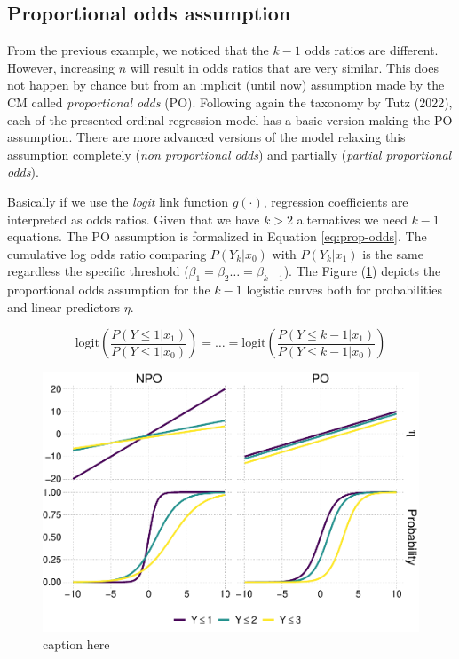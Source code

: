 \documentclass[
  man,floatsintext]{apa6}
\begin{document}
\normalsize

\subsection{Proportional odds assumption}\label{proportional-odds-assumption}

From the previous example, we noticed that the \(k - 1\) odds ratios are different. However, increasing \(n\) will result in odds ratios that are very similar. This does not happen by chance but from an implicit (until now) assumption made by the CM called \emph{proportional odds} (PO). Following again the taxonomy by Tutz (2022), each of the presented ordinal regression model has a basic version making the PO assumption. There are more advanced versions of the model relaxing this assumption completely (\emph{non proportional odds}) and partially (\emph{partial proportional odds}).

Basically if we use the \emph{logit} link function \(g(\cdot)\), regression coefficients are interpreted as odds ratios. Given that we have \(k > 2\) alternatives we need \(k - 1\) equations. The PO assumption is formalized in Equation \eqref{eq:prop-odds}. The cumulative log odds ratio comparing \(P(Y_k|x_0)\) with \(P(Y_k|x_1)\) is the same regardless the specific threshold (\(\beta_1 = \beta_2 \dots = \beta_{k - 1}\)). The Figure (\ref{fig:fig-prop-odds}) depicts the proportional odds assumption for the \(k - 1\) logistic curves both for probabilities and linear predictors \(\eta\).

\begin{equation}
\text{logit} (\frac{P(Y \leq 1 |x_1)}{P(Y \leq 1 |x_0)}) = \dots = \text{logit} (\frac{P(Y \leq k - 1 |x_1)}{P(Y \leq k -1 |x_0)})
\label{eq:prop-odds}
\end{equation}

\scriptsize

\begin{figure}

{\centering \includegraphics{paper-new_files/figure-latex/fig-prop-odds-1} 

}

\caption{caption here}\label{fig:fig-prop-odds}
\end{figure}
\end{document}
